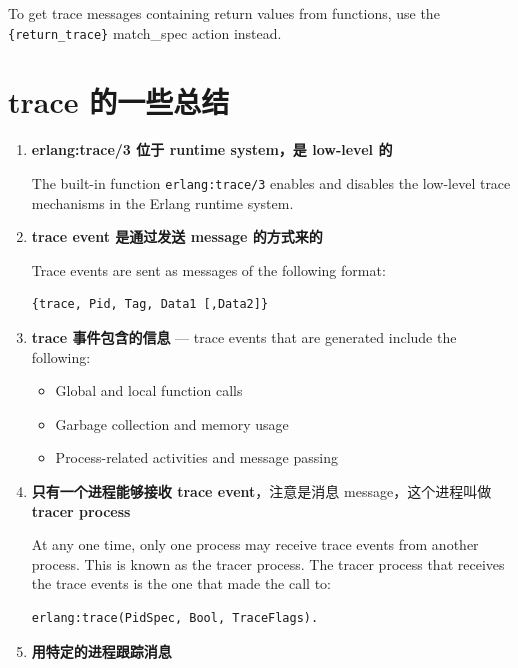 \documentclass[a4paper,11pt]{article}
\begin{document}
To get trace messages containing return values from functions, use the \lstinline|{return_trace}| match\_spec action instead.

\section{trace 的一些总结}

\begin{enumerate}[leftmargin=1.5em]
    \item \textbf{erlang:trace/3 位于 runtime system，是 low-level 的}

    The built-in function \lstinline|erlang:trace/3| enables and disables the low-level trace mechanisms in the Erlang runtime system.

    \item \textbf{trace event 是通过发送 message 的方式来的}

    Trace events are sent as messages of the following format:
    \begin{lstlisting}
{trace, Pid, Tag, Data1 [,Data2]}
    \end{lstlisting}

    \item \textbf{trace 事件包含的信息} --- trace events that are generated include the following:
    \begin{itemize}
        \item Global and local function calls
        \item Garbage collection and memory usage
        \item Process-related activities and message passing
    \end{itemize}

    \item \textbf{只有一个进程能够接收 trace event}，注意是消息 message，这个进程叫做 \textbf{tracer process}

    At any one time, only one process may receive trace events from another process. This is known as the tracer process. The tracer process that receives the trace events is the one that made the call to:
    \begin{lstlisting}
erlang:trace(PidSpec, Bool, TraceFlags).
    \end{lstlisting}

    \item \textbf{用特定的进程跟踪消息}


\end{enumerate}
\end{document}
